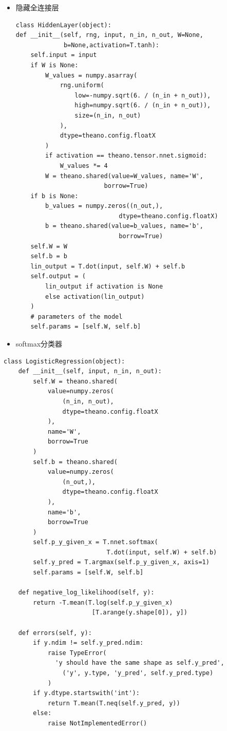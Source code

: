 \documentclass[bachelor,zhspacing]{cqu}  %
\begin{document}
\begin{itemize}
\item
  隐藏全连接层

\begin{verbatim}
class HiddenLayer(object):
def __init__(self, rng, input, n_in, n_out, W=None,
             b=None,activation=T.tanh):
    self.input = input
    if W is None:
        W_values = numpy.asarray(
            rng.uniform(
                low=-numpy.sqrt(6. / (n_in + n_out)),
                high=numpy.sqrt(6. / (n_in + n_out)),
                size=(n_in, n_out)
            ),
            dtype=theano.config.floatX
        )
        if activation == theano.tensor.nnet.sigmoid:
            W_values *= 4
        W = theano.shared(value=W_values, name='W', 
                        borrow=True)
    if b is None:
        b_values = numpy.zeros((n_out,), 
                            dtype=theano.config.floatX)
        b = theano.shared(value=b_values, name='b',
                            borrow=True)
    self.W = W
    self.b = b
    lin_output = T.dot(input, self.W) + self.b
    self.output = (
        lin_output if activation is None
        else activation(lin_output)
    )
    # parameters of the model
    self.params = [self.W, self.b]
\end{verbatim}
\item
  softmax分类器
\end{itemize}

\begin{verbatim}
class LogisticRegression(object):
    def __init__(self, input, n_in, n_out):
        self.W = theano.shared(
            value=numpy.zeros(
                (n_in, n_out),
                dtype=theano.config.floatX
            ),
            name='W',
            borrow=True
        )
        self.b = theano.shared(
            value=numpy.zeros(
                (n_out,),
                dtype=theano.config.floatX
            ),
            name='b',
            borrow=True
        )
        self.p_y_given_x = T.nnet.softmax(
                            T.dot(input, self.W) + self.b)
        self.y_pred = T.argmax(self.p_y_given_x, axis=1)
        self.params = [self.W, self.b]

    def negative_log_likelihood(self, y):
        return -T.mean(T.log(self.p_y_given_x)
                        [T.arange(y.shape[0]), y])

    def errors(self, y):
        if y.ndim != self.y_pred.ndim:
            raise TypeError(
              'y should have the same shape as self.y_pred',
                ('y', y.type, 'y_pred', self.y_pred.type)
            )
        if y.dtype.startswith('int'):
            return T.mean(T.neq(self.y_pred, y))
        else:
            raise NotImplementedError()
\end{verbatim}
\end{document}
